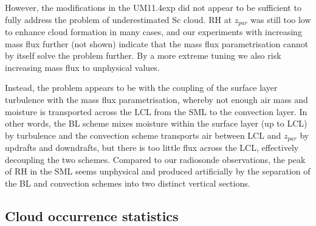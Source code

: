 However, the modifications in the UM11.4exp
did not appear to be sufficient to fully address the problem of underestimated
Sc cloud. RH at $z_{par}$ was still too low to enhance cloud formation in many cases, and our experiments with
increasing mass flux further (not shown) indicate that the mass flux
parametrisation cannot by itself solve the problem further. By a more extreme
tuning we also risk increasing mass flux to unphysical values.

Instead, the problem appears to be with the coupling of the surface layer
turbulence with the mass flux parametrisation, whereby not enough air mass
and moisture is transported across the LCL from the SML to the convection layer. In
other words, the BL scheme mixes moisture within the surface layer (up to LCL)
by turbulence and the convection scheme transports air between LCL and
$z_{par}$ by updrafts and downdrafts, but there is too little flux across the LCL,
effectively decoupling the two schemes. Compared to our
radiosonde observations, the peak of RH in the SML seems unphysical and
produced artificially by the separation of the BL and convection schemes
into two distinct vertical sections.


\subsection{Cloud occurrence statistics}
\label{sec:cloud-occurrence-statistics}

